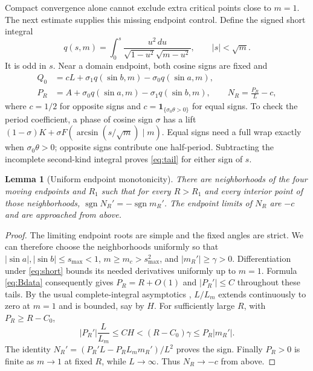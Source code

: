 \documentclass[11pt,a4paper]{article}
\newtheorem{lemma}[theorem]{Lemma}
\theoremstyle{remark}\newtheorem{remark}[theorem]{Remark}
\newcommand{\ind}{\mathbf{1}}
\begin{document}
Compact convergence alone cannot exclude extra critical points close to
$m=1$. The next estimate supplies this missing endpoint control.
Define the signed short integral
\begin{equation}\label{eq:short}
 q(s,m)=\int_0^s\frac{u^2\,du}{\sqrt{1-u^2}\sqrt{m-u^2}},
 \qquad |s|<\sqrt m.
\end{equation}
It is odd in $s$. Near a domain endpoint, both cosine signs are fixed and
\begin{equation}\label{eq:tail}
 \begin{aligned}
 Q_0&=cL+\sigma_1q(\sin b,m)-\sigma_0q(\sin a,m),\\
 P_R&=A+\sigma_0q(\sin a,m)-\sigma_1q(\sin b,m),\qquad
 N_R=\frac{P_R}{L}-c,
 \end{aligned}
\end{equation}
where $c=1/2$ for opposite signs and
$c=\ind_{\{\sigma_0\theta>0\}}$ for equal signs.
To check the period coefficient, a phase of cosine sign $\sigma$ has a
lift $(1-\sigma)K+\sigma F(\arcsin(s/\sqrt m)\mid m)$.
Equal signs need a full wrap exactly when $\sigma_0\theta>0$;
opposite signs contribute one half-period. Subtracting the incomplete
second-kind integral proves \eqref{eq:tail} for either sign of $s$.

\begin{lemma}[Uniform endpoint monotonicity]\label{lem:tails}
There are neighborhoods of the four moving endpoints and $R_1$ such
that for every $R>R_1$ and every interior point of those neighborhoods,
$\operatorname{sgn}N_R'=-\operatorname{sgn}m_R'$.
The endpoint limits of $N_R$ are $-c$ and are approached from above.
\end{lemma}
\begin{proof}
The limiting endpoint roots are simple and the fixed angles are strict.
We can therefore choose the neighborhoods uniformly so that
$|\sin a|,|\sin b|\le s_{\max}<1$,
$m\ge m_c>s_{\max}^2$, and $|m_R'|\ge\gamma>0$.
Differentiation under \eqref{eq:short} bounds its needed derivatives
uniformly up to $m=1$. Formula \eqref{eq:Bdata} consequently gives
$P_R=R+O(1)$ and $|P_R'|\le C$ throughout these tails.
By the usual complete-integral asymptotics \cite[Section 19.12]{DLMF},
$L/L_m$ extends continuously to zero at $m=1$ and is bounded, say by $H$.
For sufficiently large $R$, with $P_R\ge R-C_0$,
\[
 |P_R'|\frac L{L_m}\le CH<(R-C_0)\gamma\le P_R|m_R'|.
\]
The identity $N_R'=(P_R'L-P_RL_m m_R')/L^2$ proves the sign.
Finally $P_R>0$ is finite as $m\to1$ at fixed $R$, while $L\to\infty$.
Thus $N_R\to-c$ from above.
\end{proof}
\end{document}
